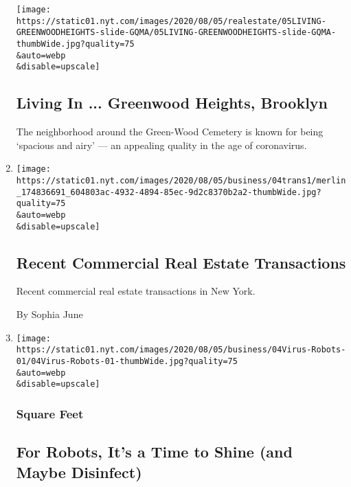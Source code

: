 \begin{enumerate}
  \texttt{[image: https://static01.nyt.com/images/2020/08/05/realestate/05LIVING-GREENWOODHEIGHTS-slide-GQMA/05LIVING-GREENWOODHEIGHTS-slide-GQMA-thumbWide.jpg?quality=75\\\&auto=webp\\\&disable=upscale]}

  \hypertarget{living-in--greenwood-heights-brooklyn}{%
  \subsection{Living In ... Greenwood Heights,
  Brooklyn}\label{living-in--greenwood-heights-brooklyn}}

  The neighborhood around the Green-Wood Cemetery is known for being
  `spacious and airy' --- an appealing quality in the age of
  coronavirus.
\item
  \href{/2020/08/04/business/recent-commercial-real-estate-transactions.html}{}

  \texttt{[image: https://static01.nyt.com/images/2020/08/05/business/04trans1/merlin\_174836691\_604803ac-4932-4894-85ec-9d2c8370b2a2-thumbWide.jpg?quality=75\\\&auto=webp\\\&disable=upscale]}

  \hypertarget{recent-commercial-real-estate-transactions}{%
  \subsection{Recent Commercial Real Estate
  Transactions}\label{recent-commercial-real-estate-transactions}}

  Recent commercial real estate transactions in New York.

  By Sophia June
\item
  \href{/2020/08/04/business/robot-cleaning-coronavirus.html}{}

  \texttt{[image: https://static01.nyt.com/images/2020/08/05/business/04Virus-Robots-01/04Virus-Robots-01-thumbWide.jpg?quality=75\\\&auto=webp\\\&disable=upscale]}

  \hypertarget{square-feet}{%
  \subsubsection{Square Feet}\label{square-feet}}

  \hypertarget{for-robots-its-a-time-to-shine-and-maybe-disinfect}{%
  \subsection{For Robots, It's a Time to Shine (and Maybe
  Disinfect)}\label{for-robots-its-a-time-to-shine-and-maybe-disinfect}}


\end{enumerate}
